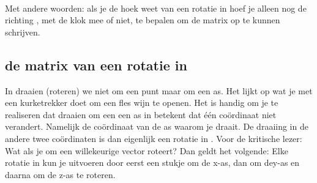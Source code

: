 
\\
Met andere woorden: als je de hoek weet van een rotatie in \RT hoef je alleen nog de richting , met de klok mee of niet,  te bepalen om de matrix op te kunnen schrijven.

\subsection{de matrix van een rotatie in \RD}
In \RD draaien (roteren) we niet om een punt maar om een as. Het lijkt op wat je met een kurketrekker doet om een fles wijn te openen. Het is handig om je te realiseren dat draaien om een een as in \RD betekent dat één coördinaat niet verandert. Namelijk de coördinaat van de as waarom je draait.  De draaiing in de andere twee coördinaten is dan eigenlijk een rotatie in \RT. Voor de kritische lezer: Wat als je  om een willekeurige vector roteert? Dan geldt het volgende: Elke rotatie in \RD kun je uitvoeren door eerst een stukje om de x-as, dan om dey-as en daarna om de z-as te roteren.




